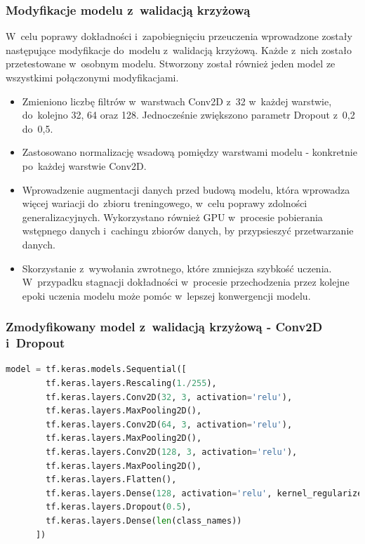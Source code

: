 \subsubsection{Modyfikacje modelu z~walidacją krzyżową}

W~celu poprawy dokładności i~zapobiegnięciu przeuczenia wprowadzone
zostały następujące modyfikacje do~modelu z~walidacją krzyżową.
Każde z~nich zostało przetestowane w~osobnym modelu.
Stworzony został również jeden model ze wszystkimi połączonymi modyfikacjami. 
\begin{itemize}[label=-,labelsep=0.4cm,leftmargin=0.6cm]
    \item Zmieniono liczbę filtrów w~warstwach Conv2D z~32 w~każdej warstwie, do~kolejno 32, 64 oraz 128.
		Jednocześnie zwiększono parametr Dropout z~0,2 do~0,5.
    \item Zastosowano normalizację wsadową pomiędzy warstwami modelu - konkretnie po~każdej warstwie Conv2D.
    \item Wprowadzenie augmentacji danych przed budową modelu, która wprowadza więcej wariacji do~zbioru treningowego,
		w~celu poprawy zdolności generalizacyjnych.
		Wykorzystano również GPU w~procesie pobierania wstępnego danych i~cachingu zbiorów danych, by przypsieszyć przetwarzanie danych.
	\item Skorzystanie z~wywołania zwrotnego, które zmniejsza szybkość uczenia.
		W~przypadku stagnacji dokładności w~procesie przechodzenia przez kolejne epoki uczenia modelu
		może pomóc w~lepszej konwergencji modelu.
\end{itemize}

\clearpage

\subsubsection{Zmodyfikowany model z~walidacją krzyżową - Conv2D i~Dropout}

\begin{lstlisting}[language=Python,caption=Listing zmodyfikowanego skryptu tworzącego model z~walidacją krzyżową - wersja 1,
	label={tests-model-crossval1}]
	model = tf.keras.models.Sequential([
		tf.keras.layers.Rescaling(1./255),
		tf.keras.layers.Conv2D(32, 3, activation='relu'),
		tf.keras.layers.MaxPooling2D(),
		tf.keras.layers.Conv2D(64, 3, activation='relu'),
		tf.keras.layers.MaxPooling2D(),
		tf.keras.layers.Conv2D(128, 3, activation='relu'),
		tf.keras.layers.MaxPooling2D(),
		tf.keras.layers.Flatten(),
		tf.keras.layers.Dense(128, activation='relu', kernel_regularizer=tf.keras.regularizers.l2(0.01)),
		tf.keras.layers.Dropout(0.5),
		tf.keras.layers.Dense(len(class_names))
	  ])
\end{lstlisting}

